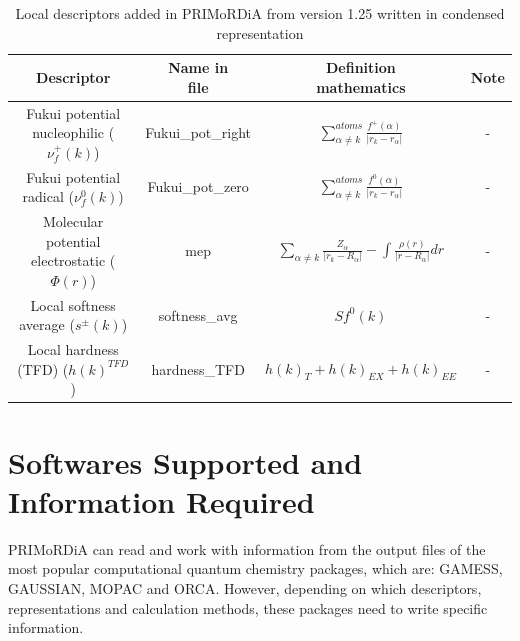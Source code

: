 \documentclass[a4paper,11pt]{refart}
\begin{document}
\hspace*{-\leftmarginwidth}
\begin{minipage}{\fullwidth}
	\begin{table}[H]
		\centering
		\caption{Local descriptors added in PRIMoRDiA from version 1.25 written in condensed representation}
		\begin{tabular}{c|c|c|c}
			\toprule
			Descriptor &\makecell{Name in\\file}&\makecell{Definition\\mathematics}& Note \\
			\midrule
			\makecell{Fukui potential \\nucleophilic ($\nu_{f}^{+}(k)$)} & Fukui\_pot\_right & $\sum_{\alpha \neq k }^{atoms} \frac{f ^{+}(\alpha)}{|r_k - r_{\alpha}|}$ & - \\ \hline
			\makecell{Fukui potential \\radical ($\nu_{f}^{0}(k)$) }& Fukui\_pot\_zero & $\sum_{\alpha \neq k }^{atoms} \frac{f ^{0}(\alpha)}{|r_k - r_{\alpha}|}$ & - \\ \hline
			\makecell{Molecular potential\\ electrostatic ( $\Phi(r)$) } & mep & $\sum_{\alpha \neq k} \frac{Z_{\alpha}}{|r_k-R_{\alpha}| } - \int \frac{\rho(r)}{|r-R_{\alpha}|} dr$ & - \\ \hline
			\makecell{Local softness \\average ($s^{\pm}(k)$)} & softness\_avg & $Sf^{0}(k)$ & - \\ \hline
			\makecell{Local hardness\\ (TFD) ($h(k)^{TFD}$)} & hardness\_TFD & $h(k)_{T} + h(k)_{EX}+h(k )_{EE}$ & - \\
			\bottomrule
		\end{tabular}
		\label{tab_local4}
	\end{table}
\end{minipage}

\section{Softwares Supported and Information Required}

PRIMoRDiA can read and work with information from the output files of the most popular computational quantum chemistry packages, which are: GAMESS, GAUSSIAN, MOPAC and ORCA. However, depending on which descriptors, representations and calculation methods, these packages need to write specific information.
\end{document}
